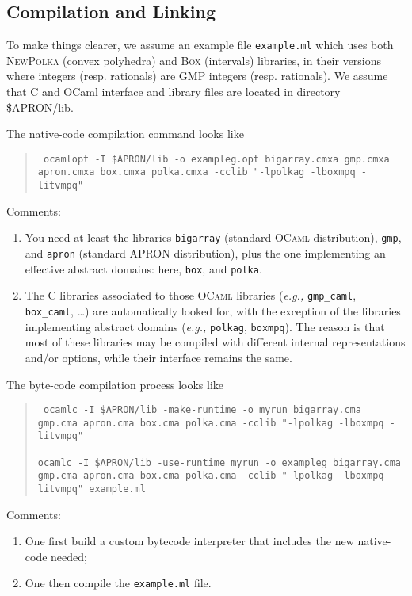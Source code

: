 \documentclass[twoside,10pt,a4paper]{report}
\begin{document}
\subsection*{Compilation and Linking}

To make things clearer, we assume an example file
\texttt{example.ml} which uses both \textsc{NewPolka} (convex
polyhedra) and \textsc{Box} (intervals) libraries, in their
versions where integers (resp. rationals) are GMP integers (resp.
rationals). We assume that C and OCaml interface and library files
are located in directory \$APRON/lib.

The native-code compilation command looks like
\begin{quote}\tt
  ocamlopt -I \$APRON/lib -o exampleg.opt bigarray.cmxa gmp.cmxa apron.cmxa box.cmxa polka.cmxa -cclib "-lpolkag -lboxmpq -litvmpq"
\end{quote}
Comments:
\begin{enumerate}
\item You need at least the libraries \texttt{bigarray} (standard
  \textsc{OCaml} distribution), \texttt{gmp}, and \texttt{apron}
  (standard APRON distribution), plus the one implementing an
  effective abstract domains: here, \texttt{box}, and
  \texttt{polka}.
\item The C libraries associated to those \textsc{OCaml} libraries
  (\textit{e.g.,} \texttt{gmp\_caml}, \texttt{box\_caml}, \ldots)
  are automatically looked for, with the exception of the
  libraries implementing abstract domains (\textit{e.g.,}
  \texttt{polkag}, \texttt{boxmpq}). The reason is that most of
  these libraries may be compiled with different internal
  representations and/or options, while their interface remains
  the same.
\end{enumerate}

The byte-code compilation process looks like
\begin{quote}\tt
  ocamlc -I \$APRON/lib -make-runtime -o myrun bigarray.cma gmp.cma apron.cma box.cma polka.cma -cclib "-lpolkag -lboxmpq -litvmpq" \\
  ~\\
  ocamlc -I \$APRON/lib -use-runtime myrun -o exampleg bigarray.cma gmp.cma apron.cma box.cma polka.cma -cclib "-lpolkag -lboxmpq -litvmpq" example.ml
\end{quote}
Comments:
\begin{enumerate}
\item One first build a custom bytecode interpreter that includes the new native-code needed;
\item One then compile the \texttt{example.ml} file.
\end{enumerate}
\end{document}
